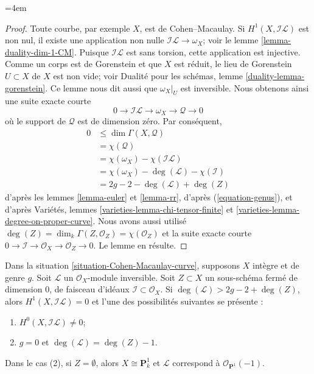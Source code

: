 \begingroup\emergencystretch=4em
\begin{proof}
Toute courbe, par exemple $X$, est de Cohen--Macaulay. Si $H^1(X, \mathcal{I}\mathcal{L})$ est non nul, il existe une application non nulle $\mathcal{I}\mathcal{L} \to \omega_X$; voir le lemme \ref{lemma-duality-dim-1-CM}. Puisque $\mathcal{I}\mathcal{L}$ est sans torsion, cette application est injective. Comme un corps est de Gorenstein et que $X$ est réduit, le lieu de Gorenstein $U \subset X$ de $X$ est non vide; voir Dualité pour les schémas, lemme \ref{duality-lemma-gorenstein}. Ce lemme nous dit aussi que $\omega_X|_U$ est inversible. Nous obtenons ainsi une suite exacte courte $$
0 \to \mathcal{I}\mathcal{L} \to \omega_X \to \mathcal{Q} \to 0
$$ où le support de $\mathcal{Q}$ est de dimension zéro. Par conséquent, \begin{align*}
0 & \leq \dim \Gamma(X, \mathcal{Q})\\
& =
\chi(\mathcal{Q}) \\
& =
\chi(\omega_X) - \chi(\mathcal{I}\mathcal{L}) \\
& =
\chi(\omega_X) - \deg(\mathcal{L}) - \chi(\mathcal{I}) \\
& =
2g - 2 - \deg(\mathcal{L}) + \deg(Z)
\end{align*} d'après les lemmes \ref{lemma-euler} et \ref{lemma-rr}, d'après (\ref{equation-genus}), et d'après Variétés, lemmes \ref{varieties-lemma-chi-tensor-finite} et \ref{varieties-lemma-degree-on-proper-curve}. Nous avons aussi utilisé $\deg(Z) = \dim_k \Gamma(Z, \mathcal{O}_Z) = \chi(\mathcal{O}_Z)$ et la suite exacte courte $0 \to \mathcal{I} \to \mathcal{O}_X \to \mathcal{O}_Z \to 0$. Le lemme en résulte.
\end{proof}
\endgroup

\begin{lemma}
\label{lemma-degree-more-than-2g-2}
\begin{reference}
\cite[Lemme 2]{Jongmin}
\end{reference}
Dans la situation \ref{situation-Cohen-Macaulay-curve}, supposons $X$ intègre et de genre $g$. Soit $\mathcal{L}$ un $\mathcal{O}_X$-module inversible. Soit $Z \subset X$ un sous-schéma fermé de dimension $0$, de faisceau d'idéaux $\mathcal{I} \subset \mathcal{O}_X$. Si $\deg(\mathcal{L}) > 2g - 2 + \deg(Z)$, alors $H^1(X, \mathcal{I}\mathcal{L}) = 0$ et l'une des possibilités suivantes se présente :
\begin{enumerate}
\item $H^0(X, \mathcal{I}\mathcal{L}) \not = 0$;
\item $g = 0$ et $\deg(\mathcal{L}) = \deg(Z) - 1$.
\end{enumerate}
Dans le cas (2), si $Z = \emptyset$, alors $X \cong \mathbf{P}^1_k$ et $\mathcal{L}$ correspond à $\mathcal{O}_{\mathbf{P}^1}(-1)$.
\end{lemma}

